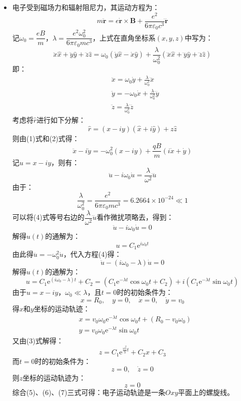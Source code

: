 \documentclass[a4paper,fontset=none]{ctexart}
\begin{document}
\begin{itemize}
\begin{itemize}
        \item[\bullet] 垂直于磁场方向：三个频率分别为$\omega_0$、$\omega_0-\omega_L$、$\omega_0+\omega_L$的线偏振光。
    \end{itemize}

    \item[6.(1)]
    \setcounter{equation}{0}
    电子受到磁场力和辐射阻尼力，其运动方程为：
    \[
        m\ddot{\bm{r}} = e\dot{\bm{r}} \times \bm{B} + \frac{e^2}{6\pi\varepsilon_0c^3}\dddot{\bm{r}}
    \]
    记$\omega_0=\dfrac{eB}{m}$，$\lambda=\dfrac{e^2\omega_0^2}{6\pi\varepsilon_0mc^3}$，上式在直角坐标系$(x,y,z)$中写为：
    \[
        \ddot{x}\hat{x} + \ddot{y}\hat{y} + \ddot{z}\hat{z} = \omega_0(\dot{y}\hat{x} - \dot{x}\hat{y}) + \frac{\lambda}{\omega_0^2}(\dddot{x}\hat{x} + \dddot{y}\hat{y} + \dddot{z}\hat{z})
    \]
    即：
    \begin{align}
        &\ddot{x} = \omega_0\dot{y} + \frac{\lambda}{\omega_0^2}\dddot{x} \\
        &\ddot{y} = -\omega_0\dot{x} + \frac{\lambda}{\omega_0^2}\dddot{y} \\
        &\ddot{z} = \frac{\lambda}{\omega_0^2}\dddot{z}
    \end{align}
    考虑将$\hat{r}$进行如下分解：
    \[
        \hat{r} = (x-iy)(\hat{x}+i\hat{y}) + z\hat{z}
    \]
    则由(1)式和(2)式得：
    \[
        \ddot{x} - i\ddot{y} = -\omega_0^2(x-iy) + \frac{qB}{m}(i\dot{x}+\dot{y})
    \]
    记$u=x-iy$，则有：
    \begin{equation}
        \ddot{u} - i\omega_0\dot{u} = \frac{\lambda}{\omega^2}\dddot{u}
    \end{equation}
    由于：
    \[
        \frac{\lambda}{\omega_0^2} = \frac{e^2}{6\pi\varepsilon_0mc^3} = 6.2664 \times 10^{-24} \ll 1
    \]
    可以将(4)式等号右边的$\dfrac{\lambda}{\omega^2}\dddot{u}$看作微扰项略去，得到：
    \[
        \ddot{u} - i\omega_0\dot{u} = 0
    \]
    解得$u(t)$的通解为：
    \[
        u = C_1\mathrm{e}^{i\omega_0t}
    \]
    由此得$\dddot{u}=-\omega_0^2\dot{u}$，代入方程(4)得：
    \[
        \ddot{u} - (i\omega_0 - \lambda)\dot{u} = 0
    \]
    解得$u(t)$的通解为：
    \[
        u = C_1\mathrm{e}^{(i\omega_0 - \lambda)t} + C_2 = \left(C_1\mathrm{e}^{-\lambda t}\cos\omega_0t + C_2\right) + i\left(C_1\mathrm{e}^{-\lambda t}\sin\omega_0t\right)
    \]
    由于$u=x-iy$，$\omega_0\ll\lambda$，且$t=0$时的初始条件为：
    \[
        x = R_0,\quad y = 0,\quad \dot{x} = 0,\quad \dot{y} = v_0
    \]
    得$x$和$y$坐标的运动轨迹：
    \begin{align}
        &x = v_0\omega_0\mathrm{e}^{-\lambda t}\cos\omega_0t + \left(R_0 - v_0\omega_0\right) \\
        &y = v_0\omega_0\mathrm{e}^{-\lambda t}\sin\omega_0t
    \end{align}
    又由(3)式解得：
    \[
        z = C_1\mathrm{e}^{\tfrac{\omega_0^2}{\lambda}t} + C_2x + C_3
    \]
    而$t=0$时的初始条件为：
    \[
        z = 0,\quad \dot{z} = 0
    \]
    则$z$坐标的运动轨迹为：
    \begin{equation}
        z = 0
    \end{equation}
    综合(5)、(6)、(7)三式可得：电子运动轨迹是一条$Oxy$平面上的螺旋线。


\end{itemize}
\end{document}
